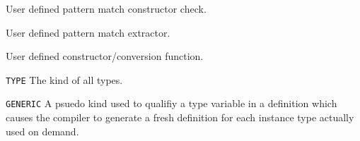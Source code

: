 \documentclass[oneside]{book}
\begin{document}
\begin{description}
\item[{\tt \_match\_ctor\_}name]
User defined pattern match constructor check.

\item[{\tt \_ctor\_arg\_}name]
User defined pattern match extractor.


\item[{\tt \_ctor\_arg\_}typename]
User defined constructor/conversion function.

\item{{\tt TYPE}}
The kind of all types.

\item{{\tt GENERIC}}
A psuedo kind used to qualifiy a type variable
in a definition which causes the compiler to generate
a fresh definition for each instance type actually
used on demand.

\end{description}

\clearpage
\printglossaries
\clearpage
{}
\printindex
\backmatter
\end{document}
